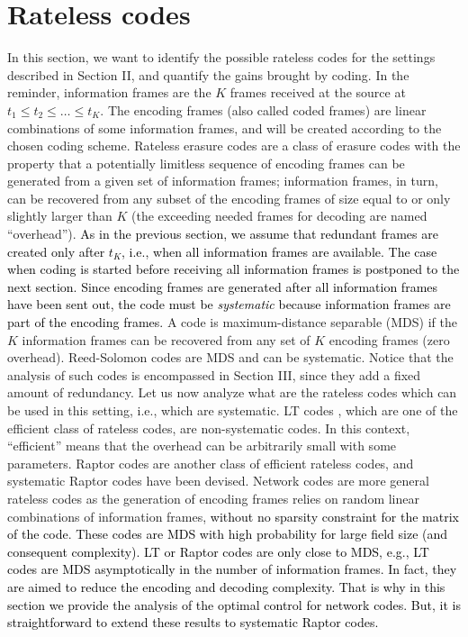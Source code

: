 \documentclass[10pt,twocolumn,conference,final]{IEEEtran}
\begin{document}
\section{Rateless codes}\label{sec:rataft}
In this section, we want to identify the possible rateless codes for the settings described in Section II, and quantify the gains brought by coding. In the reminder, information frames are the $K$ frames received at the source at $t_1\leq t_2\leq \dots \leq t_K$. The encoding frames (also called coded frames) are linear combinations of some information frames, and will be created according to the chosen coding scheme. Rateless erasure codes are a class of erasure codes with the property that a potentially limitless sequence of encoding frames can be generated from a given set of information frames; information frames, in turn, can be recovered from any subset of the encoding frames of size equal to or only slightly larger than $K$ (the exceeding needed frames for decoding are named ``overhead'').
\textcolor{black}{As in the previous section, we assume that redundant frames are created only after $t_K$, i.e., when all 
information frames are available. The case when coding is started before receiving all information frames is postponed to the next section.}
\textcolor{black}{Since encoding frames are generated after all information frames have been sent out, the code must be {\em systematic} because information frames are part of the encoding frames.} A code is maximum-distance separable (MDS) if the $K$ information frames can be recovered from any set of $K$ encoding frames (zero overhead). Reed-Solomon codes are MDS and can be systematic. Notice that the analysis of such codes is encompassed in Section III, since they add a fixed amount of redundancy. Let us now analyze what are the rateless codes which can be used in this setting, i.e., which are systematic. LT codes \cite{Luby}, which are one of the efficient class of rateless codes, are non-systematic codes. In this context, ``efficient'' means that the overhead can be arbitrarily small with some parameters. Raptor codes \cite{Shokrollahi} are another class of efficient rateless codes, and systematic Raptor codes have been devised. Network codes \cite{Lun} are more general rateless codes as the generation of encoding frames relies on random linear combinations of information frames, \textcolor{black}{without no sparsity constraint for the matrix of the code}. \textcolor{black}{These codes are MDS with high probability for large field size (and consequent complexity). LT or Raptor codes are only close to MDS, e.g., LT codes are MDS asymptotically in the number of information frames. In fact, they are aimed to reduce the encoding and decoding complexity. That is why in this section we provide the analysis of the optimal control for network codes. But, it is straightforward to extend these results to systematic Raptor codes.}\\
\end{document}
